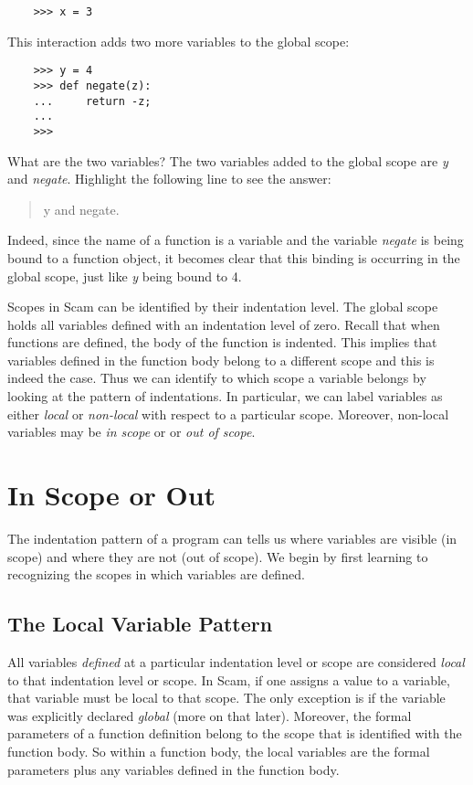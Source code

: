 \begin{verbatim}
    >>> x = 3
\end{verbatim}

This interaction adds two more variables to the global scope:

\begin{verbatim}
    >>> y = 4
    >>> def negate(z):
    ...     return -z;
    ...
    >>>
\end{verbatim}

What are the two variables?
\T The two variables added to the global scope are {\it y} and {\it negate}.
\W Highlight the following line to see the answer:

\W\begin{quote}
 {\color{white} y and negate.}
\W\end{quote}

Indeed, since the name of a function is a variable and the variable {\it negate}
is being bound to a function object, it becomes clear that
this binding is occurring in the
global scope, just like {\it y} being bound to 4.

Scopes in Scam can be identified by their indentation level.
The global scope holds all variables defined with an indentation
level of zero.
Recall that when functions are defined, the body of the function
is indented. This implies that variables defined in the function body
belong to a different scope and this is indeed the case.
Thus we can identify to which scope a variable belongs by
looking at the pattern of indentations.
In particular,
we can label variables as 
either {\it local} or {\it non-local}
with respect to a particular scope.
Moreover, non-local variables may be {\it in scope} or
or {\it out of scope}.

\section{In Scope or Out}

The indentation pattern of a program can tells us where
variables are visible (in scope) and where they are
not (out of scope).
We begin by first learning to recognizing the scopes in which variables
are defined.

\subsection{The Local Variable Pattern}

All variables {\it defined} at a particular
indentation level or scope are considered
{\it local} to that indentation level or scope.
In Scam, if one assigns a value to a variable, that variable
must be local to that scope.
The only exception is if the variable was
explicitly declared {\it global} (more on that later).
Moreover, the formal parameters of a function definition
belong to the scope that is identified with
the function body. 
So within a function body, the local variables are the formal
parameters plus any variables defined in the function body.

